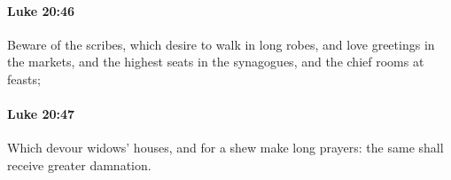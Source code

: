 		\paragraph{Luke 20:46} %
			\label{LUKE-20-46}

			Beware of the scribes, which desire to walk in long robes, and love greetings in the markets, and the highest seats in the synagogues, and the chief rooms at feasts;

			\begin{framed}
			\scriptsize
				\begin{compactdesc}
					\item[SBLG] 
				\end{compactdesc}
			\end{framed}

		\paragraph{Luke 20:47} %
			\label{LUKE-20-47}

			Which devour widows' houses, and for a shew make long prayers: the same shall receive greater damnation.

